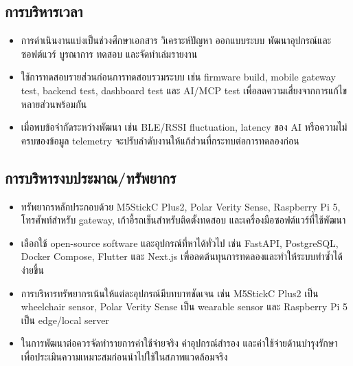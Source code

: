 \subsection*{การบริหารเวลา}
\begin{itemize}
    \item การดำเนินงานแบ่งเป็นช่วงศึกษาเอกสาร วิเคราะห์ปัญหา ออกแบบระบบ พัฒนาอุปกรณ์และซอฟต์แวร์ บูรณาการ ทดสอบ และจัดทำเล่มรายงาน 
    \item ใช้การทดสอบรายส่วนก่อนการทดสอบรวมระบบ เช่น firmware build, mobile gateway test, backend test, dashboard test และ AI/MCP test เพื่อลดความเสี่ยงจากการแก้ไขหลายส่วนพร้อมกัน 
    \item เมื่อพบข้อจำกัดระหว่างพัฒนา เช่น BLE/RSSI fluctuation, latency ของ AI หรือความไม่ครบของข้อมูล telemetry จะปรับลำดับงานให้แก้ส่วนที่กระทบต่อการทดลองก่อน 
\end{itemize}

\subsection*{การบริหารงบประมาณ/ทรัพยากร}
\begin{itemize}
    \item ทรัพยากรหลักประกอบด้วย M5StickC Plus2, Polar Verity Sense, Raspberry Pi 5, โทรศัพท์สำหรับ gateway, เก้าอี้รถเข็นสำหรับติดตั้งทดสอบ และเครื่องมือซอฟต์แวร์ที่ใช้พัฒนา 
    \item เลือกใช้ open-source software และอุปกรณ์ที่หาได้ทั่วไป เช่น FastAPI, PostgreSQL, Docker Compose, Flutter และ Next.js เพื่อลดต้นทุนการทดลองและทำให้ระบบทำซ้ำได้ง่ายขึ้น 
    \item การบริหารทรัพยากรเน้นให้แต่ละอุปกรณ์มีบทบาทชัดเจน เช่น M5StickC Plus2 เป็น wheelchair sensor, Polar Verity Sense เป็น wearable sensor และ Raspberry Pi 5 เป็น edge/local server 
    \item ในการพัฒนาต่อควรจัดทำรายการค่าใช้จ่ายจริง ค่าอุปกรณ์สำรอง และค่าใช้จ่ายด้านบำรุงรักษา เพื่อประเมินความเหมาะสมก่อนนำไปใช้ในสภาพแวดล้อมจริง 
\end{itemize}


